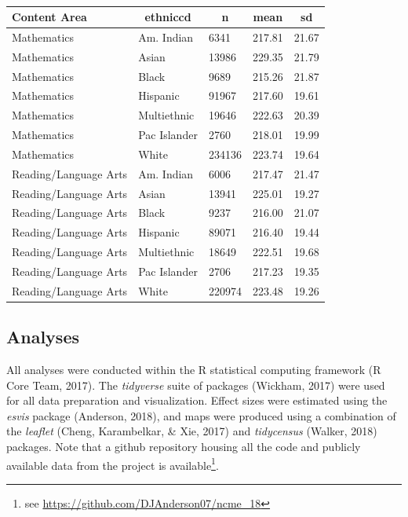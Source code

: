 \documentclass[man, fleqn, noextraspace]{apa6}
\theoremstyle{definition}
\theoremstyle{definition}
\theoremstyle{definition}
\theoremstyle{remark}
\begin{document}
\begin{table}[tbp]
\begin{center}
\begin{threeparttable}
\caption{\label{tab:descrips}}
\begin{tabular}{lllll}
\toprule
Content Area & \multicolumn{1}{c}{ethniccd} & \multicolumn{1}{c}{n} & \multicolumn{1}{c}{mean} & \multicolumn{1}{c}{sd}\\
\midrule
Mathematics & Am. Indian & 6341 & 217.81 & 21.67\\
Mathematics & Asian & 13986 & 229.35 & 21.79\\
Mathematics & Black & 9689 & 215.26 & 21.87\\
Mathematics & Hispanic & 91967 & 217.60 & 19.61\\
Mathematics & Multiethnic & 19646 & 222.63 & 20.39\\
Mathematics & Pac Islander & 2760 & 218.01 & 19.99\\
Mathematics & White & 234136 & 223.74 & 19.64\\
Reading/Language Arts & Am. Indian & 6006 & 217.47 & 21.47\\
Reading/Language Arts & Asian & 13941 & 225.01 & 19.27\\
Reading/Language Arts & Black & 9237 & 216.00 & 21.07\\
Reading/Language Arts & Hispanic & 89071 & 216.40 & 19.44\\
Reading/Language Arts & Multiethnic & 18649 & 222.51 & 19.68\\
Reading/Language Arts & Pac Islander & 2706 & 217.23 & 19.35\\
Reading/Language Arts & White & 220974 & 223.48 & 19.26\\
\bottomrule
\end{tabular}
\end{threeparttable}
\end{center}
\end{table}

\hypertarget{analyses}{%
\subsection{Analyses}\label{analyses}}

All analyses were conducted within the R statistical computing framework
(R Core Team, 2017). The \emph{tidyverse} suite of packages (Wickham,
2017) were used for all data preparation and visualization. Effect sizes
were estimated using the \emph{esvis} package (Anderson, 2018), and maps
were produced using a combination of the \emph{leaflet} (Cheng,
Karambelkar, \& Xie, 2017) and \emph{tidycensus} (Walker, 2018)
packages. Note that a github repository housing all the code and
publicly available data from the project is available\footnote{see
  \url{https://github.com/DJAnderson07/ncme_18}}.
\end{document}
